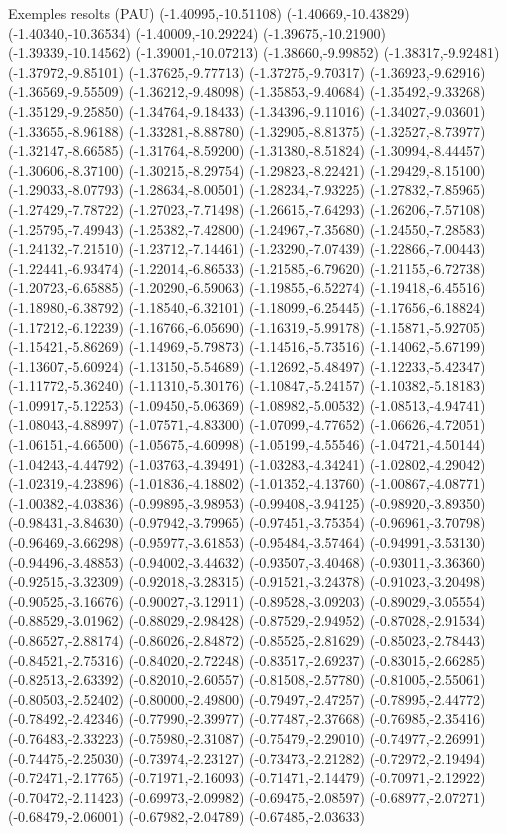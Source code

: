 \documentclass[11pt,a4paper]{article}
\begin{document}
\begin{fmex}{Exemples resolts (PAU)}
(-1.40995,-10.51108) (-1.40669,-10.43829) (-1.40340,-10.36534) (-1.40009,-10.29224) (-1.39675,-10.21900) (-1.39339,-10.14562) (-1.39001,-10.07213) (-1.38660,-9.99852) (-1.38317,-9.92481) (-1.37972,-9.85101) (-1.37625,-9.77713) (-1.37275,-9.70317) (-1.36923,-9.62916) (-1.36569,-9.55509) (-1.36212,-9.48098) (-1.35853,-9.40684) (-1.35492,-9.33268) (-1.35129,-9.25850) (-1.34764,-9.18433) (-1.34396,-9.11016) (-1.34027,-9.03601) (-1.33655,-8.96188) (-1.33281,-8.88780) (-1.32905,-8.81375) (-1.32527,-8.73977) (-1.32147,-8.66585) (-1.31764,-8.59200) (-1.31380,-8.51824) (-1.30994,-8.44457) (-1.30606,-8.37100) (-1.30215,-8.29754) (-1.29823,-8.22421) (-1.29429,-8.15100) (-1.29033,-8.07793) (-1.28634,-8.00501) (-1.28234,-7.93225) (-1.27832,-7.85965) (-1.27429,-7.78722) (-1.27023,-7.71498) (-1.26615,-7.64293) (-1.26206,-7.57108) (-1.25795,-7.49943) (-1.25382,-7.42800) (-1.24967,-7.35680) (-1.24550,-7.28583) (-1.24132,-7.21510) (-1.23712,-7.14461) (-1.23290,-7.07439) (-1.22866,-7.00443) (-1.22441,-6.93474) (-1.22014,-6.86533) (-1.21585,-6.79620) (-1.21155,-6.72738) (-1.20723,-6.65885) (-1.20290,-6.59063) (-1.19855,-6.52274) (-1.19418,-6.45516) (-1.18980,-6.38792) (-1.18540,-6.32101) (-1.18099,-6.25445) (-1.17656,-6.18824) (-1.17212,-6.12239) (-1.16766,-6.05690) (-1.16319,-5.99178) (-1.15871,-5.92705) (-1.15421,-5.86269) (-1.14969,-5.79873) (-1.14516,-5.73516) (-1.14062,-5.67199) (-1.13607,-5.60924) (-1.13150,-5.54689) (-1.12692,-5.48497) (-1.12233,-5.42347) (-1.11772,-5.36240) (-1.11310,-5.30176) (-1.10847,-5.24157) (-1.10382,-5.18183) (-1.09917,-5.12253) (-1.09450,-5.06369) (-1.08982,-5.00532) (-1.08513,-4.94741) (-1.08043,-4.88997) (-1.07571,-4.83300) (-1.07099,-4.77652) (-1.06626,-4.72051) (-1.06151,-4.66500) (-1.05675,-4.60998) (-1.05199,-4.55546) (-1.04721,-4.50144) (-1.04243,-4.44792) (-1.03763,-4.39491) (-1.03283,-4.34241) (-1.02802,-4.29042) (-1.02319,-4.23896) (-1.01836,-4.18802) (-1.01352,-4.13760) (-1.00867,-4.08771) (-1.00382,-4.03836) (-0.99895,-3.98953) (-0.99408,-3.94125) (-0.98920,-3.89350) (-0.98431,-3.84630) (-0.97942,-3.79965) (-0.97451,-3.75354) (-0.96961,-3.70798) (-0.96469,-3.66298) (-0.95977,-3.61853) (-0.95484,-3.57464) (-0.94991,-3.53130) (-0.94496,-3.48853) (-0.94002,-3.44632) (-0.93507,-3.40468) (-0.93011,-3.36360) (-0.92515,-3.32309) (-0.92018,-3.28315) (-0.91521,-3.24378) (-0.91023,-3.20498) (-0.90525,-3.16676) (-0.90027,-3.12911) (-0.89528,-3.09203) (-0.89029,-3.05554) (-0.88529,-3.01962) (-0.88029,-2.98428) (-0.87529,-2.94952) (-0.87028,-2.91534) (-0.86527,-2.88174) (-0.86026,-2.84872) (-0.85525,-2.81629) (-0.85023,-2.78443) (-0.84521,-2.75316) (-0.84020,-2.72248) (-0.83517,-2.69237) (-0.83015,-2.66285) (-0.82513,-2.63392) (-0.82010,-2.60557) (-0.81508,-2.57780) (-0.81005,-2.55061) (-0.80503,-2.52402) (-0.80000,-2.49800) (-0.79497,-2.47257) (-0.78995,-2.44772) (-0.78492,-2.42346) (-0.77990,-2.39977) (-0.77487,-2.37668) (-0.76985,-2.35416) (-0.76483,-2.33223) (-0.75980,-2.31087) (-0.75479,-2.29010) (-0.74977,-2.26991) (-0.74475,-2.25030) (-0.73974,-2.23127) (-0.73473,-2.21282) (-0.72972,-2.19494) (-0.72471,-2.17765) (-0.71971,-2.16093) (-0.71471,-2.14479) (-0.70971,-2.12922) (-0.70472,-2.11423) (-0.69973,-2.09982) (-0.69475,-2.08597) (-0.68977,-2.07271) (-0.68479,-2.06001) (-0.67982,-2.04789) (-0.67485,-2.03633) 
\end{fmex}
\end{document}
